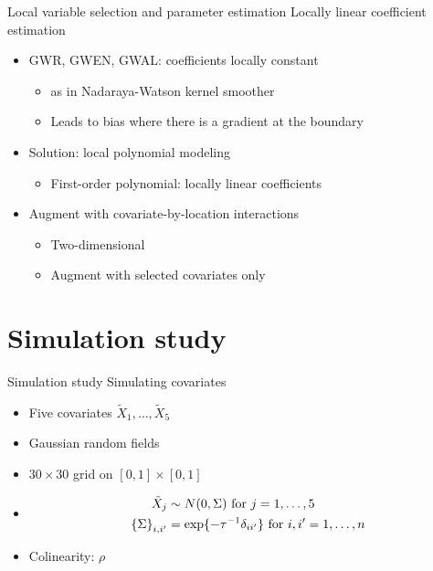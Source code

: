 \documentclass[12pt,t]{beamer}
\newcommand{\subt}[1]{{\footnotesize \color{subtitle} {#1}}}
\begin{document}
\begin{frame}{Local variable selection and  parameter estimation}
\subt{Locally linear coefficient estimation}

\bigskip
\begin{itemize}
  \item GWR, GWEN, GWAL: coefficients locally constant
  \begin{itemize}
    \item as in Nadaraya-Watson kernel smoother
    \item Leads to bias where there is a gradient at the boundary 
  \end{itemize}
  \item Solution: local polynomial modeling
  \begin{itemize}
    \item First-order polynomial: locally linear coefficients
  \end{itemize}
  \item Augment with covariate-by-location interactions
  \begin{itemize}
    \item Two-dimensional
    \item Augment with selected covariates only
  \end{itemize}
\end{itemize}

\end{frame}




\section{Simulation study}




\begin{frame}{Simulation study}
\subt{Simulating covariates}

\bigskip
\begin{itemize}
  \item Five covariates $\tilde{X}_1, \dots, \tilde{X}_5$ 
  \item Gaussian random fields
  \item $30 \times 30$ grid on $[0,1] \times [0,1]$
  \item \begin{align}
  \tilde{X}_j &\sim N(0, \Sigma) \text{ for } j = 1, \dots, 5 \notag \\
  \left\{\Sigma\right\}_{i,i'} &= \exp \{ -\tau^{-1} \delta_{ii'}\} \text{ for } i,i' = 1, \dots, n \notag
  \end{align}
  \item Colinearity: $\rho$
\end{itemize}

\end{frame}
\end{document}
